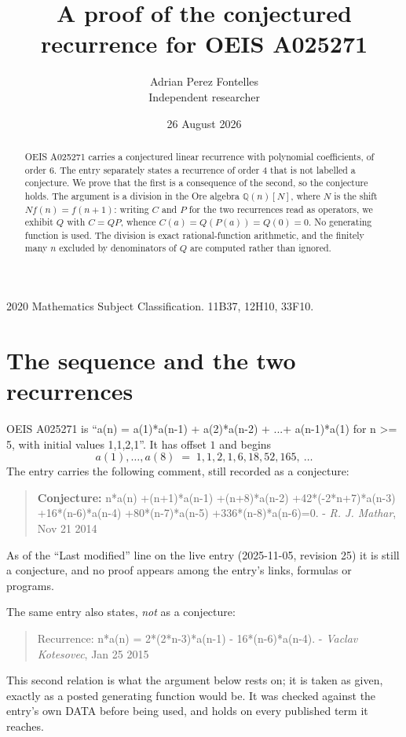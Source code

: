 \documentclass[11pt,a4paper]{article}
\title{A proof of the conjectured recurrence for OEIS A025271}
\author{Adrian Perez Fontelles\\ \small Independent researcher}
\date{26 August 2026}
\theoremstyle{plain}
\theoremstyle{definition}
\begin{document}
\maketitle

\begin{abstract}
OEIS A025271 carries a conjectured linear recurrence with polynomial coefficients, of
order 6. The entry separately states a recurrence of order 4 that is not
labelled a conjecture. We prove that the first is a consequence of the second, so the
conjecture holds. The argument is a division in the Ore algebra
$\mathbb{Q}(n)[N]$, where $N$ is the shift $Nf(n)=f(n+1)$: writing $C$ and $P$ for the two
recurrences read as operators, we exhibit $Q$ with $C=QP$, whence
$C(a)=Q(P(a))=Q(0)=0$. No generating function is used. The division is exact
rational-function arithmetic, and the finitely many $n$ excluded by denominators of $Q$
are computed rather than ignored.
\end{abstract}

\noindent\small 2020 Mathematics Subject Classification. 11B37, 12H10, 33F10.\normalsize

\section{The sequence and the two recurrences}

OEIS A025271 is ``a(n) = a(1)*a(n-1) + a(2)*a(n-2) + ...+ a(n-1)*a(1) for n >= 5, with initial values 1,1,2,1''. It has offset $1$ and begins
\[
a(1),\dots,a(8)\;=\;1, 1, 2, 1, 6, 18, 52, 165,\ \dots
\]
The entry carries the following comment, still recorded as a conjecture:
\begin{quote}\small
\textbf{Conjecture:} n*a(n) +(n+1)*a(n-1) +(n+8)*a(n-2) +42*(-2*n+7)*a(n-3) +16*(n-6)*a(n-4) +80*(n-7)*a(n-5) +336*(n-8)*a(n-6)=0. - \emph{R. J. Mathar}, Nov 21 2014
\end{quote}
As of the ``Last modified'' line on the live entry (2025-11-05, revision 25) it is still
a conjecture, and no proof appears among the entry's links, formulas or programs.

The same entry also states, \emph{not} as a conjecture:
\begin{quote}\small
Recurrence: n*a(n) = 2*(2*n-3)*a(n-1) - 16*(n-6)*a(n-4). - \emph{Vaclav Kotesovec}, Jan 25 2015
\end{quote}
This second relation is what the argument below rests on; it is taken as given, exactly as
a posted generating function would be. It was checked against the entry's own DATA before
being used, and holds on every published term it reaches.
\end{document}
